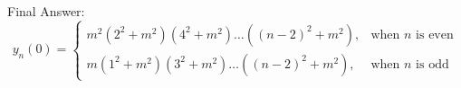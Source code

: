 \documentclass[11pt, a4paper]{article}
\begin{document}
Final Answer:
\[ 
\boxed{y_n(0) = \begin{cases} 
m^2(2^2 + m^2)(4^2 + m^2) \dots ((n-2)^2 + m^2), & \text{when } n \text{ is even} \\ 
m(1^2 + m^2)(3^2 + m^2) \dots ((n-2)^2 + m^2), & \text{when } n \text{ is odd} 
\end{cases}} 
\]

\end{document}

